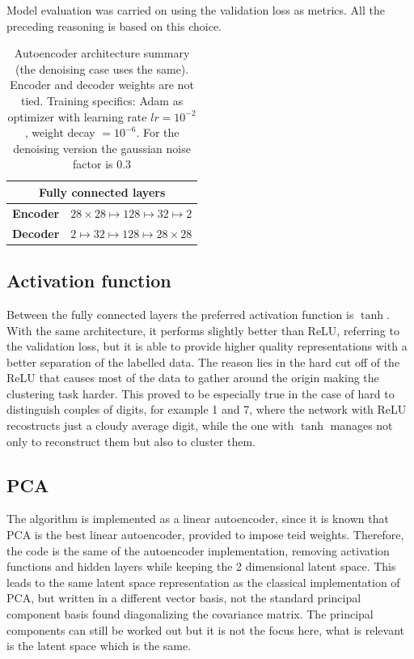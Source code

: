 \documentclass[twocolumn,gsifonts,twoside]{gsipaper}
\begin{document}
Model evaluation was carried on using the validation loss as metrics. All the preceding reasoning is based on this choice.

\begin{table}
  \centering
  \begin{tabular}{c c}
    \toprule
    \multicolumn{2}{c}{Fully connected layers} \\ 
    \midrule
    \textbf{Encoder} & $28\times28 \mapsto 128 \mapsto 32 \mapsto 2$ \\
    \textbf{Decoder} & $2 \mapsto 32 \mapsto 128 \mapsto 28\times28$ \\
    \bottomrule
  \end{tabular}
  \caption{Autoencoder architecture summary (the denoising case uses the same). Encoder and decoder weights are not tied. Training specifics: Adam as optimizer with learning rate $lr=10^{-2}$, weight decay $=10^{-6}$. For the denoising version the gaussian noise factor is 0.3}
  \label{tab:architecture}
\end{table}


\subsection{Activation function}
Between the fully connected layers the preferred activation function is $\tanh$. With the same architecture, it performs slightly better than ReLU, referring to the validation loss, but it is able to provide higher quality representations with a better separation of the labelled data. The reason lies in the hard cut off of the ReLU that causes most of the data to gather around the origin making the clustering task harder. This proved to be especially true in the case of hard to distinguish couples of digits, for example 1 and 7, where the network with ReLU recostructs just a cloudy average digit, while the one with $\tanh$ manages not only to reconstruct them but also to cluster them.

\subsection{PCA}
The algorithm is implemented as a linear autoencoder, since it is known that PCA is the best linear autoencoder, provided to impose teid weights. Therefore, the code is the same of the autoencoder implementation, removing activation functions and hidden layers while keeping the 2 dimensional latent space. This leads to the same latent space representation as the classical implementation of PCA, but written in a different vector basis, not the standard principal component basis found diagonalizing the covariance matrix. The principal components can still be worked out \cite{Plaut2018} but it is not the focus here, what is relevant is the latent space which is the same.
\end{document}
